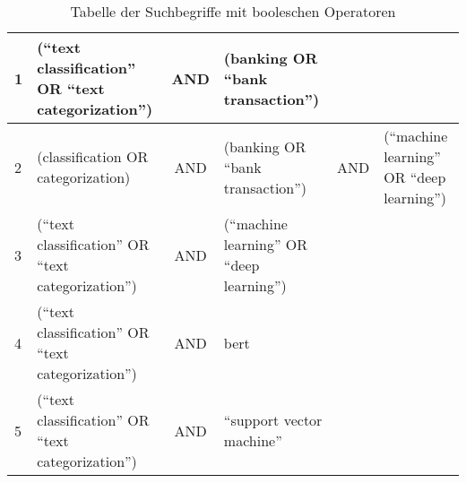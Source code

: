 \setcounter{table}{0}
\begin{table}[htbp]
	\renewcommand{\arraystretch}{1.5}
	\caption{Tabelle der Suchbegriffe mit booleschen Operatoren}
	\label{tab:suchbegriffe}
	\begin{tabularx}{\textwidth}{|l| X| c |X| c| X|}
		\hline
		1 & (\enquote{text classification} OR \enquote{text categorization}) & AND & (banking OR \enquote{bank transaction})                 &     &                                                         \\
		\hline
		2 & (classification OR categorization)                               & AND & (banking OR \enquote{bank transaction})                 & AND & (\enquote{machine learning} OR \enquote{deep learning}) \\
		\hline
		3 & (\enquote{text classification} OR \enquote{text categorization}) & AND & (\enquote{machine learning} OR \enquote{deep learning}) &     &                                                         \\
		\hline
		4 & (\enquote{text classification} OR \enquote{text categorization}) & AND & bert                                                    &     &                                                         \\
		\hline
		5 & (\enquote{text classification} OR \enquote{text categorization}) & AND & \enquote{support vector machine}                        &     &                                                         \\
		\hline
	\end{tabularx}
\end{table}

\vspace{-12pt}
\vspace{-12pt}
\vspace{-12pt}
\vspace{-12pt}
\vspace{-12pt}
